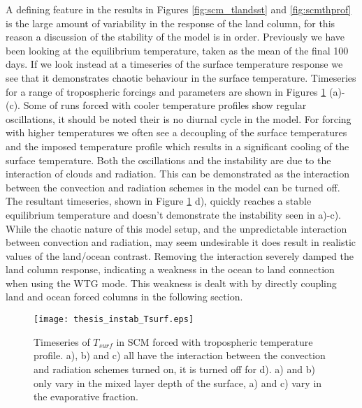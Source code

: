 A defining feature in the results in Figures \ref{fig:scm_tlandsst} and 
\ref{fig:scmthprof} is the large amount of variability in the response of the 
land column, for this reason a discussion of the stability of the model is in 
order. Previously we have been looking at the equilibrium temperature, taken as 
the mean of the final 100 days. If we look instead at a timeseries of the 
surface temperature response we see that it demonstrates chaotic behaviour in 
the surface temperature. Timeseries for a range of tropospheric forcings and 
parameters are shown in Figures \ref{fig:scmts} (a)-(c). Some of runs forced 
with cooler temperature profiles show regular oscillations, it should be noted 
their is no diurnal cycle in the model.  For forcing with higher temperatures we 
often see a decoupling of the surface temperatures and the imposed temperature 
profile which results in a significant cooling of the surface temperature.  Both 
the oscillations and the instability are due to the interaction of clouds and 
radiation. This can be demonstrated as the interaction between the convection 
and radiation schemes in the model can be turned off. The resultant timeseries, 
shown in Figure \ref{fig:scmts} d), quickly reaches a stable equilibrium 
temperature and doesn't demonstrate the instability seen in a)-c). While the 
chaotic nature of this model setup, and the unpredictable interaction between 
convection and radiation, may seem undesirable it does result in realistic 
values of the land/ocean contrast. Removing the interaction severely damped the 
land column response, indicating a weakness in the ocean to land connection when 
using the WTG mode. This weakness is dealt with by directly coupling land and 
ocean forced columns in the following section.

\begin{figure}[ht]
\texttt{[image: thesis\_instab\_Tsurf.eps]}
\caption{Timeseries of $T_{surf}$ in SCM forced with tropospheric temperature 
profile. a), b) and c) all have the interaction between the convection and 
radiation schemes turned on, it is turned off for d). a) and b) only vary in the 
mixed layer depth of the surface, a) and c) vary in the evaporative fraction.}
\label{fig:scmts}
\end{figure}

